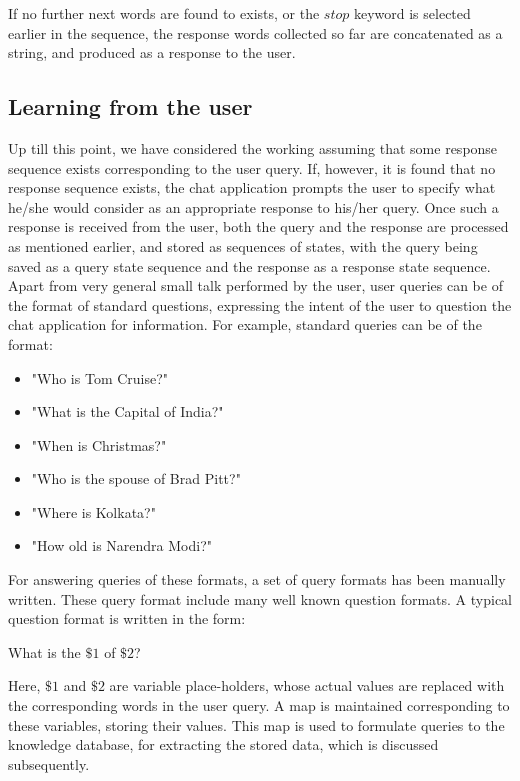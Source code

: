 \documentclass[12pt,a4paper]{article}
\begin{document}
If no further next words are found to exists, or the $stop$ keyword is selected earlier in the sequence, the response words collected so far are concatenated as a string, and produced as a response to the user.

\subsection{Learning from the user}
Up till this point, we have considered the working assuming that some response sequence exists corresponding to the user query. If, however, it is found that no response sequence exists, the chat application prompts the user to specify what he/she would consider as an appropriate response to his/her query. Once such a response is received from the user, both the query and the response are processed as mentioned earlier, and stored as sequences of states, with the query being saved as a query state sequence and the response as a response state sequence.\\

Apart from very general small talk performed by the user, user queries can be of the format of standard questions, expressing the intent of the user to question the chat application for information. For example, standard queries can be of the format:

\begin{itemize}
\item "Who is Tom Cruise?"
\item "What is the Capital of India?"
\item "When is Christmas?"
\item "Who is the spouse of Brad Pitt?"
\item "Where is Kolkata?"
\item "How old is Narendra Modi?"
\end{itemize}

For answering queries of these formats, a set of query formats has been manually written. These query format include many well known question formats. A typical question format is written in the form:

\begin{center}
What is the $\$1$ of $\$2$?
\end{center}

Here, $\$1$ and $\$2$ are variable place-holders, whose actual values are replaced with the corresponding words in the user query. A map is maintained corresponding to these variables, storing their values. This map is used to formulate queries to the knowledge database, for extracting the stored data, which is discussed subsequently.\\
\end{document}
